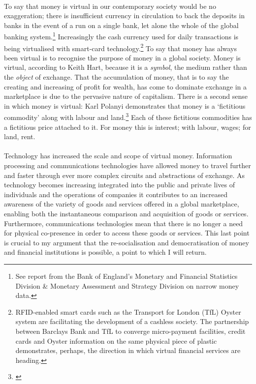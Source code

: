 \documentclass[12pt,a4paper,titlepage]{article}
\begin{document}
\paragraph{}To say that money is virtual in our contemporary society would be no exaggeration; there is insufficient currency in circulation to back the deposits in banks in the event of a run on a single bank, let alone the whole of the global banking system.\footnote{See report from the Bank of England's Monetary and Financial Statistics Division \& Monetary Assessment and Strategy Division on narrow money data.} Increasingly the cash currency used for daily transactions is being virtualised with smart-card technology.\footnote{RFID-enabled smart cards such as the Transport for London (TfL) Oyster system are facilitating the development of a cashless society. The partnership between Barclays Bank and TfL to converge micro-payment facilities, credit cards and Oyster information on the same physical piece of plastic demonstrates, perhaps, the direction in which virtual financial services are heading.} To say that money has always been virtual is to recognise the purpose of money in a global society. Money is virtual, according to Keith Hart, because it is a \textit{symbol}, the medium rather than the \textit{object} of exchange. That the accumulation of money, that is to say the creating and increasing of profit for wealth, has come to dominate exchange in a marketplace is due to the pervasive nature of capitalism. There is a second sense in which money is virtual: Karl Polanyi demonstrates that money is a `fictitious commodity' along with labour and land.\footnote{\cite[Ch. 6]{Polanyi:1957mi}} Each of these fictitious commodities has a fictitious price attached to it. For money this is interest; with labour, wages; for land, rent.

\paragraph{}Technology has increased the scale and scope of virtual money. Information processing and communications technologies have allowed money to travel further and faster through ever more complex circuits and abstractions of exchange. As technology becomes increasing integrated into the public and private lives of individuals and the operations of companies it contributes to an increased awareness of the variety of goods and services offered in a global marketplace, enabling both the instantaneous comparison and acquisition of goods or services. Furthermore, communications technologies mean that there is no longer a need for physical co-presence in order to access these goods or services. This last point is crucial to my argument that the re-socialisation and democratisation of money and financial institutions is possible, a point to which I will return.
\end{document}
